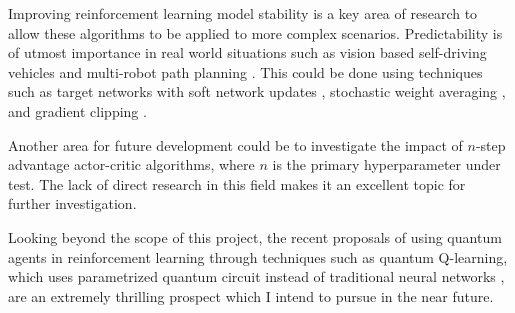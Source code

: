 Improving reinforcement learning model stability is a key area of research to
allow these algorithms to be applied to more complex scenarios. Predictability
is of utmost importance in real world situations such as vision based
self-driving vehicles \cite{liang2018cirl, sallab2016end} and multi-robot path
planning \cite{yang2020multi}. This could be done using techniques such as
target networks with soft network updates \cite{lillicrap2015continuous},
stochastic weight averaging \cite{nikishin2018improving}, and gradient clipping
\cite{mai2021stability}.

Another area for future development could be to investigate the impact of
$n$-step advantage actor-critic algorithms, where $n$ is the primary
hyperparameter under test. The lack of direct research in this field makes it
an excellent topic for further investigation.

Looking beyond the scope of this project, the recent proposals of using quantum
agents in reinforcement learning through techniques such as quantum Q-learning,
which uses parametrized quantum circuit instead of traditional neural networks
\cite{skolik2022quantum}, are an extremely thrilling prospect which I intend to
pursue in the near future.

\nocite{*}
